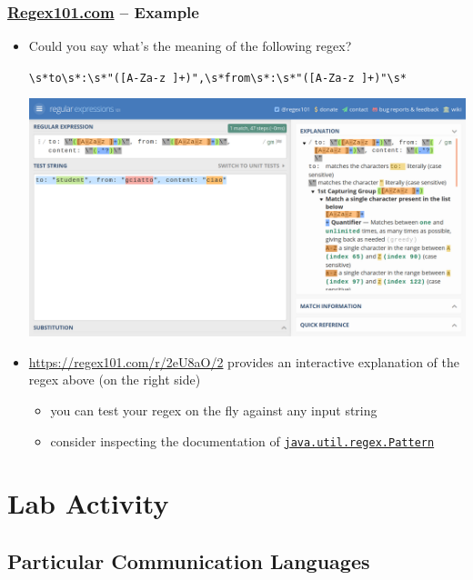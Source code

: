 \documentclass[presentation]{beamer}\mode<presentation>{\usetheme{AMSCesenaPurpleAndGold}}
\newcommand{\bs}[1]{\textbackslash{}#1}
\begin{document}
\begin{frame}
	\frametitle{\href{https://regex101.com/}{Regex101.com} -- Example}
	
	\begin{itemize}
		\item Could you say what's the meaning of the following regex?
		\begin{center}\small
			\alert{\texttt{\bs{s}*to\bs{s}*:\bs{s}*"([A-Za-z ]+)",\bs{s}*from\bs{s}*:\bs{s}*"([A-Za-z ]+)"\bs{s}*}}
		\end{center}
		\begin{center}
			\includegraphics[width=.7\linewidth]{./img/regex101.png}
		\end{center}
		
		\item \url{https://regex101.com/r/2eU8aO/2} provides an interactive explanation of the regex above (on the right side) 
		\begin{itemize}
			\item you can test your regex on the fly against any input string
			\item consider inspecting the documentation of \href{https://docs.oracle.com/en/java/javase/14/docs/api/java.base/java/util/regex/Pattern.html}{\texttt{java.util.regex.\alert{Pattern}}}
		\end{itemize}		
		
	\end{itemize}  
\end{frame}

\section{Lab Activity}

\startExercise

\subsection{Particular Communication Languages} 
\end{document}
